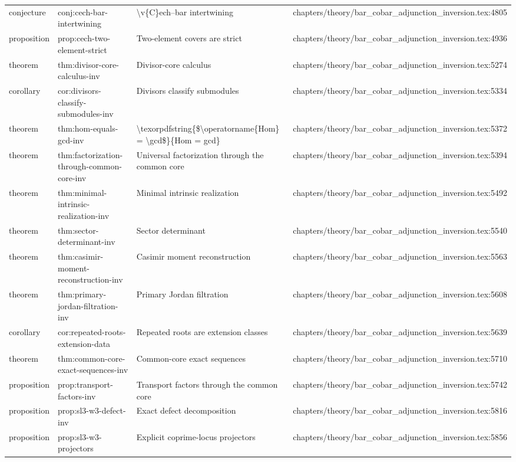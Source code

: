 \documentclass[11pt]{article}
\begin{document}
\begin{longtable}{L{0.10\textwidth}L{0.26\textwidth}L{0.42\textwidth}L{0.22\textwidth}}
conjecture & conj:cech-bar-intertwining & \textbackslash{}v\{C\}ech--bar intertwining & chapters/theory/bar\_cobar\_adjunction\_inversion.tex:4805\\
proposition & prop:cech-two-element-strict & Two-element covers are strict & chapters/theory/bar\_cobar\_adjunction\_inversion.tex:4936\\
theorem & thm:divisor-core-calculus-inv & Divisor-core calculus & chapters/theory/bar\_cobar\_adjunction\_inversion.tex:5274\\
corollary & cor:divisors-classify-submodules-inv & Divisors classify submodules & chapters/theory/bar\_cobar\_adjunction\_inversion.tex:5334\\
theorem & thm:hom-equals-gcd-inv & \textbackslash{}texorpdfstring\{\$\textbackslash{}operatorname\{Hom\} = \textbackslash{}gcd\$\}\{Hom = gcd\} & chapters/theory/bar\_cobar\_adjunction\_inversion.tex:5372\\
theorem & thm:factorization-through-common-core-inv & Universal factorization through the common core & chapters/theory/bar\_cobar\_adjunction\_inversion.tex:5394\\
theorem & thm:minimal-intrinsic-realization-inv & Minimal intrinsic realization & chapters/theory/bar\_cobar\_adjunction\_inversion.tex:5492\\
theorem & thm:sector-determinant-inv & Sector determinant & chapters/theory/bar\_cobar\_adjunction\_inversion.tex:5540\\
theorem & thm:casimir-moment-reconstruction-inv & Casimir moment reconstruction & chapters/theory/bar\_cobar\_adjunction\_inversion.tex:5563\\
theorem & thm:primary-jordan-filtration-inv & Primary Jordan filtration & chapters/theory/bar\_cobar\_adjunction\_inversion.tex:5608\\
corollary & cor:repeated-roots-extension-data & Repeated roots are extension classes & chapters/theory/bar\_cobar\_adjunction\_inversion.tex:5639\\
theorem & thm:common-core-exact-sequences-inv & Common-core exact sequences & chapters/theory/bar\_cobar\_adjunction\_inversion.tex:5710\\
proposition & prop:transport-factors-inv & Transport factors through the common core & chapters/theory/bar\_cobar\_adjunction\_inversion.tex:5742\\
proposition & prop:sl3-w3-defect-inv & Exact defect decomposition & chapters/theory/bar\_cobar\_adjunction\_inversion.tex:5816\\
proposition & prop:sl3-w3-projectors & Explicit coprime-locus projectors & chapters/theory/bar\_cobar\_adjunction\_inversion.tex:5856\\

\end{longtable}
\end{document}
